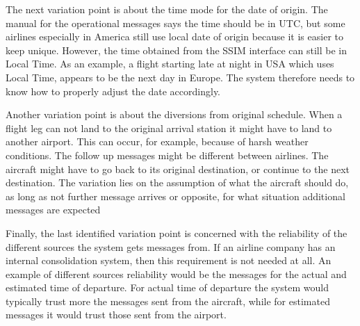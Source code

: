 The next variation point is about the time mode for the date of origin. The manual for the operational messages says the time should be in UTC, but some airlines especially in America still use local date of origin because it is easier to keep unique. However, the time obtained from the SSIM interface can still be in Local Time. As an example, a flight starting late at night in USA which uses Local Time, appears to be the next day in Europe. The system therefore needs to know how to properly adjust the date accordingly. 

Another variation point is about the diversions from original schedule. When a flight leg can not land to the original arrival station it might have to land to another airport. This can occur, for example, because of harsh weather conditions. The follow up messages might be different between airlines. The aircraft might have to go back to its original destination, or continue to the next destination. The variation lies on the assumption of what the aircraft should do, as long as not further message arrives or opposite, for what situation additional messages are expected

Finally, the last identified variation point is concerned with the reliability of the different sources the system gets messages from. If an airline company has an internal consolidation system, then this requirement is not needed at all. An example of different sources reliability would be the messages for the actual and estimated time of departure. For actual time of departure the system would typically trust more the messages sent from the aircraft, while for estimated messages it would trust those sent from the airport.  




